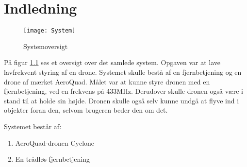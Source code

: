 \documentclass[Main]{subfiles}
\begin{document}
\chapter{Indledning}

\begin{figure}[H]
\centering
\texttt{[image: System]}
\caption{Systemoversigt}
\label{Fig:System}
\end{figure}
På figur \ref{Fig:System} ses et oversigt over det samlede system. 
Opgaven var at lave lavfrekvent styring af en drone.
Systemet skulle bestå af en fjernbetjening og en drone af mærket AeroQuad. 
Målet var at kunne styre dronen med en fjernbetjening, ved en frekvens på 433MHz. 
Derudover skulle dronen også være i stand til at holde sin højde. 
Dronen skulle også selv kunne undgå at flyve ind i objekter foran den, selvom brugeren beder den om det.

Systemet består af:
\begin{enumerate}
\item AeroQuad-dronen Cyclone
\item En trådløs fjernbetjening
\end{enumerate}
\end{document}
